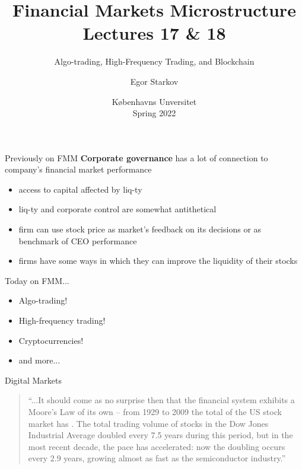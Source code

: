 \documentclass[english,10pt
,aspectratio=169
]{beamer}
\title{Financial Markets Microstructure \\ Lectures 17 \& 18}
\subtitle{Algo-trading, High-Frequency Trading, and Blockchain}
\author{Egor Starkov}
\date{K{\o}benhavns Unversitet \\
	Spring 2022}
\begin{document}
	\frame[plain]{\titlepage}


\begin{frame}{Previously on FMM}
	\textbf{Corporate governance} has a lot of connection to company's financial market performance
	\begin{itemize}
		\item access to capital affected by liq-ty
		\item liq-ty and corporate control are somewhat antithetical
		\item firm can use stock price as market's feedback on its decisions or as benchmark of CEO performance
		\item firms have some ways in which they can improve the liquidity of their stocks
	\end{itemize}
\end{frame}


\begin{frame}{Today on FMM...}
	\begin{itemize}
		\item Algo-trading!
		\item High-frequency trading!
		\item Cryptocurrencies!
		\item and more...
	\end{itemize}
\end{frame}




\begin{frame}{Digital Markets}
	\begin{quotation}
		``...It should come as no surprise then that the financial system exhibits a Moore's Law of its own -- from 1929 to 2009 the total  of the US stock market has . The total \alert{trading volume} of stocks in the Dow Jones Industrial Average \alert{doubled every 7.5 years} during this period, but in the most recent decade, the \alert{pace has accelerated}: now the doubling occurs every 2.9 years, growing almost as fast as the semiconductor industry.''
		\begin{flushright}
			\cite{kirilenko_moores_2013}
		\end{flushright}
	\end{quotation}
\end{frame}
\end{document}
